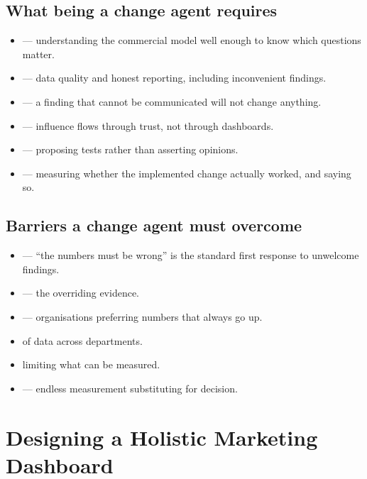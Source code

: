 \subsection{What being a change agent requires}

\begin{itemize}
\item {} --- understanding the commercial model well enough
      to know which questions matter.
\item {} --- data quality and honest reporting, including
      inconvenient findings.
\item {} --- a finding that cannot be communicated will not change
      anything.
\item {} --- influence flows through trust, not
      through dashboards.
\item {} --- proposing tests rather than
      asserting opinions.
\item {} --- measuring whether the implemented change actually
      worked, and saying so.
\end{itemize}

\subsection{Barriers a change agent must overcome}

\begin{warnbox}
\begin{itemize}
\item {} --- ``the numbers must be wrong'' is the standard first
      response to unwelcome findings.
\item {} --- the  overriding evidence.
\item {} --- organisations preferring numbers that always go up.
\item {} of data across departments.
\item {} limiting what can be measured.
\item {} --- endless measurement substituting for decision.
\end{itemize}
\end{warnbox}

\section{Designing a Holistic Marketing Dashboard}

